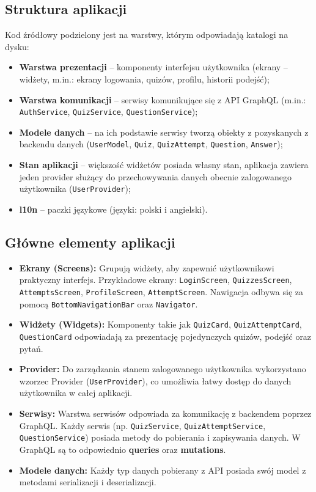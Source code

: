 \documentclass{article}
\begin{document}
	\subsection{Struktura aplikacji}
		Kod źródłowy podzielony jest na warstwy, którym odpowiadają katalogi na dysku:
		\begin{itemize}
			\item \textbf{Warstwa prezentacji} – komponenty interfejsu użytkownika (ekrany – widżety, m.in.: ekrany logowania, quizów, profilu, historii podejść);
			\item \textbf{Warstwa komunikacji} – serwisy komunikujące się z API GraphQL (m.in.: \texttt{AuthService}, \texttt{QuizService}, \texttt{QuestionService});
			\item \textbf{Modele danych} – na ich podstawie serwisy tworzą obiekty z pozyskanych z backendu danych (\texttt{UserModel}, \texttt{Quiz}, \texttt{QuizAttempt}, \texttt{Question}, \texttt{Answer});
			\item \textbf{Stan aplikacji} – większość widżetów posiada własny stan, aplikacja zawiera jeden provider służący do przechowywania danych obecnie zalogowanego użytkownika (\texttt{UserProvider});
			\item \textbf{l10n} – paczki językowe (języki: polski i angielski).
		\end{itemize}

	\subsection{Główne elementy aplikacji}
		\begin{itemize}
			\item \textbf{Ekrany (Screens):} Grupują widżety, aby zapewnić użytkownikowi praktyczny interfejs. Przykładowe ekrany: \texttt{LoginScreen}, \texttt{QuizzesScreen}, \texttt{AttemptsScreen}, \texttt{ProfileScreen}, \texttt{AttemptScreen}. Nawigacja odbywa się za pomocą \texttt{BottomNavigationBar} oraz \texttt{Navigator}.
			\item \textbf{Widżety (Widgets):} Komponenty takie jak \texttt{QuizCard}, \texttt{QuizAttemptCard}, \texttt{QuestionCard} odpowiadają za prezentację pojedynczych quizów, podejść oraz pytań.
			\item \textbf{Provider:} Do zarządzania stanem zalogowanego użytkownika wykorzystano wzorzec Provider (\texttt{UserProvider}), co umożliwia łatwy dostęp do danych użytkownika w całej aplikacji.
			\item \textbf{Serwisy:} Warstwa serwisów odpowiada za komunikację z backendem poprzez GraphQL. Każdy serwis (np. \texttt{QuizService}, \texttt{QuizAttemptService}, \texttt{QuestionService}) posiada metody do pobierania i zapisywania danych. W GraphQL są to odpowiednio \textbf{queries} oraz \textbf{mutations}.
			\item \textbf{Modele danych:} Każdy typ danych pobierany z API posiada swój model z metodami serializacji i deserializacji.
		\end{itemize}
\end{document}
